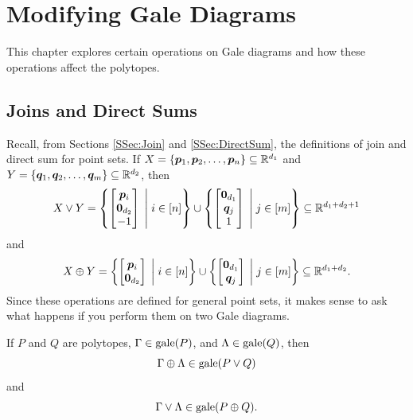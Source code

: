  \chapter{Modifying Gale Diagrams}\label{chap:GaleDiagMod}

This chapter explores certain operations on Gale diagrams and how these operations affect the polytopes.



\section{Joins and Direct Sums}

Recall, from Sections \ref{SSec:Join} and \ref{SSec:DirectSum}, the definitions of join and direct sum for point sets.  If \(X=\left\{\bm{p}_1,\bm{p}_2,\dotsc,\bm{p}_n\right\}\subseteq\mathbb{R}^{d_1}\) and \(Y=\left\{\bm{q}_1,\bm{q}_2,\dotsc,\bm{q}_m\right\}\subseteq\mathbb{R}^{d_2}\), then
    \[
        X\join Y
            =
                \setb{\begin{bmatrix}\ve p_i\\\ve0_{d_2}\\-1\end{bmatrix}}{i\in\brac n}
                \cup
                \setb{\begin{bmatrix}\ve 0_{d_1}\\\ve q_j\\1\end{bmatrix}}{j\in\brac m}
            \sbset
                \R{d_1+d_2+1}
    \]
and
    \[
        X\oplus Y
            =
                \setb{\begin{bmatrix}\ve p_i\\\ve0_{d_2}\end{bmatrix}}{i\in\brac n}
                \cup
                \setb{\begin{bmatrix}\ve 0_{d_1}\\\ve q_j\end{bmatrix}}{j\in\brac m}
            \sbset
                \R{d_1+d_2}.
    \]
Since these operations are defined for general point sets, it makes sense to ask what happens if you perform them on two Gale diagrams.
\begin{Theorem}\label{Thm:DSumAndJoin}
    If \(P\) and \(Q\) are polytopes, \(\Gamma\in\operatorname{gale}(P)\), and \(\Lambda\in\operatorname{gale}(Q)\), then
        \[
            \Gamma\oplus \Lambda
                \in
                \operatorname{gale}(P\vee Q)
        \]
    and
        \[
            \Gamma\vee \Lambda
                \in
                \operatorname{gale}(P\oplus Q).
        \]
\end{Theorem}

